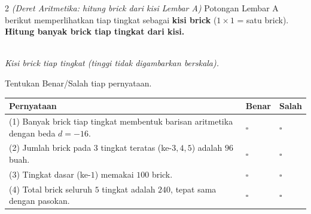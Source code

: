 \documentclass[11pt]{article}
\makeatletter
\newenvironment{bstabel}{%
  \par\smallskip\begin{center}\renewcommand{\arraystretch}{1.35}%
  \begin{tabular}{@{}p{0.72\textwidth}>{\centering\arraybackslash}m{1.5cm}>{\centering\arraybackslash}m{1.5cm}@{}}
  \toprule
  \textbf{Pernyataan} & \textbf{Benar} & \textbf{Salah}\\\midrule}%
  {\bottomrule\end{tabular}\end{center}}
\newcommand{\bs}[1]{#1 & $\square$ & $\square$\\[1pt]}
\makeatother
\begin{document}
\begin{soal}{2 \normalfont\itshape(Deret Aritmetika: hitung brick dari kisi Lembar A)}
Potongan Lembar A berikut memperlihatkan tiap tingkat sebagai \textbf{kisi brick}
($1\times1$ = satu brick). \textbf{Hitung banyak brick tiap tingkat dari kisi.}

\begin{center}
\\[2pt]
{\small\textit{Kisi brick tiap tingkat (tinggi tidak digambarkan berskala).}}
\end{center}
Tentukan Benar/Salah tiap pernyataan.
\begin{bstabel}
  \bs{(1) Banyak brick tiap tingkat membentuk barisan aritmetika dengan beda $d=-16$.}
  \bs{(2) Jumlah brick pada $3$ tingkat teratas (ke-$3,4,5$) adalah $96$ buah.}
  \bs{(3) Tingkat dasar (ke-$1$) memakai $100$ brick.}
  \bs{(4) Total brick seluruh $5$ tingkat adalah $240$, tepat sama dengan pasokan.}
\end{bstabel}
\end{soal}
\end{document}
